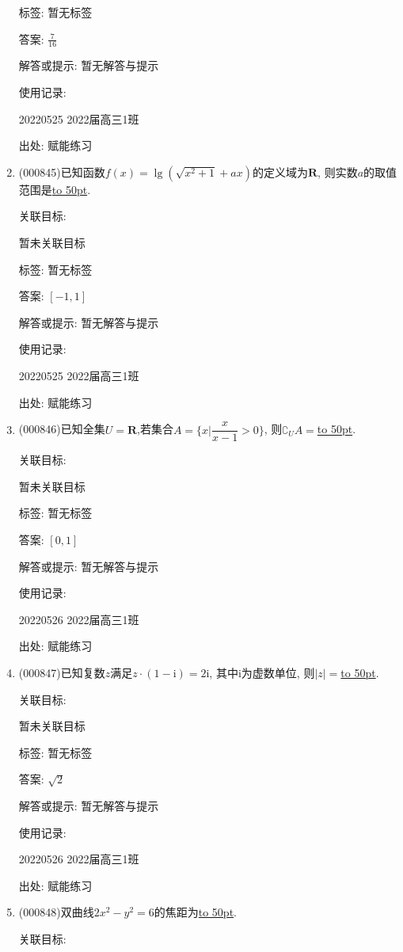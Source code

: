 \documentclass[10pt,a4paper]{article}
\newcommand{\blank}[1]{\underline{\hbox to #1pt{}}}
\begin{document}
\begin{enumerate}[1.]
标签: 暂无标签

答案: $\frac 7{16}$

解答或提示: 暂无解答与提示

使用记录:

20220525	2022届高三1班	


出处: 赋能练习
\item { (000845)}已知函数$f(x)=\lg (\sqrt{x^2+1}+ax)$的定义域为$\mathbf{R}$, 则实数$a$的取值范围是\blank{50}.


关联目标:

暂未关联目标



标签: 暂无标签

答案: $[-1, 1]$

解答或提示: 暂无解答与提示

使用记录:

20220525	2022届高三1班	


出处: 赋能练习
\item { (000846)}已知全集$U=\mathbf{R}$,若集合$A=\{x|\dfrac x{x-1}>0\}$, 则$\complement_U A=$\blank{50}.


关联目标:

暂未关联目标



标签: 暂无标签

答案: $[0,1]$

解答或提示: 暂无解答与提示

使用记录:

20220526	2022届高三1班	


出处: 赋能练习
\item { (000847)}已知复数$z$满足$z\cdot (1-\mathrm{i})=2\mathrm{i}$, 其中$\mathrm{i}$为虚数单位, 则$|z|=$\blank{50}.


关联目标:

暂未关联目标



标签: 暂无标签

答案: $\sqrt 2$

解答或提示: 暂无解答与提示

使用记录:

20220526	2022届高三1班	


出处: 赋能练习
\item { (000848)}双曲线$2 x^2-y^2=6$的焦距为\blank{50}.


关联目标:


\end{enumerate}
\end{document}
